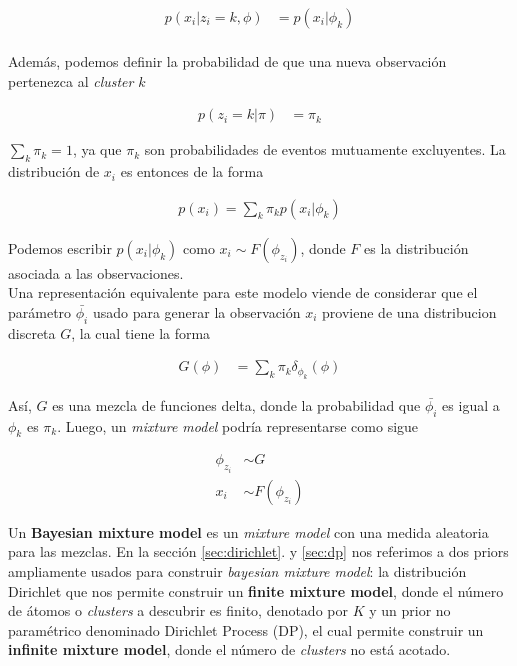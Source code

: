 \documentclass[letterpaper,12pt,oneside]{book} %
\begin{document}
\begin{align}
    p(x_{i}|z_{i}=k, \phi) & = p(x_{i}|\phi_{k})\\
\end{align}

Además, podemos definir la probabilidad de que una nueva observación pertenezca al \textit{cluster} $k$ 

\begin{align}
    p(z_{i}=k|\pi) & = \pi_{k}
\end{align}

$\sum_{k}\pi_{k} = 1$, ya que $\pi_{k}$ son probabilidades de eventos mutuamente excluyentes. La distribución de $x_{i}$ es entonces de la forma

\begin{align}
    p(x_{i}) = \sum_{k}\pi_{k}p(x_{i}|\phi_{k})
\end{align}

Podemos escribir $p(x_{i}|\phi_{k})$ como $x_{i} \sim F(\phi_{z_{i}})$, donde $F$ es la distribución asociada a las observaciones. \\

Una representación equivalente para este modelo viende de considerar que el parámetro $\bar{\phi_{i}}$ usado para generar la observación $x_{i}$ proviene de una distribucion discreta $G$, la cual tiene la forma

\begin{align}
    G(\phi) & = \sum_{k} \pi_{k}\delta_{\phi_{k}}(\phi)
\end{align}

Así, $G$ es una mezcla de funciones delta, donde la probabilidad que $\bar{\phi_{i}}$ es igual a $\phi_{k}$ es $\pi_{k}$. Luego, un \textit{mixture model} podría representarse como sigue

\begin{align}
\phi_{z_{i}} & \sim G\\
x_{i} & \sim  F(\phi_{z_{i}})
\end{align}

Un \textbf{Bayesian mixture model} es un \textit{mixture model} con una medida aleatoria para las mezclas. En la sección \ref{sec:dirichlet}. y \ref{sec:dp} nos referimos a dos priors ampliamente usados para construir \textit{bayesian mixture model}: la distribución Dirichlet que nos permite construir un \textbf{finite mixture model}, donde el número de átomos o \textit{clusters} a descubrir es finito, denotado por $K$ y un prior no paramétrico denominado Dirichlet Process (DP), el cual permite construir un \textbf{infinite mixture model}, donde el número de \textit{clusters} no está acotado. 
\end{document}
